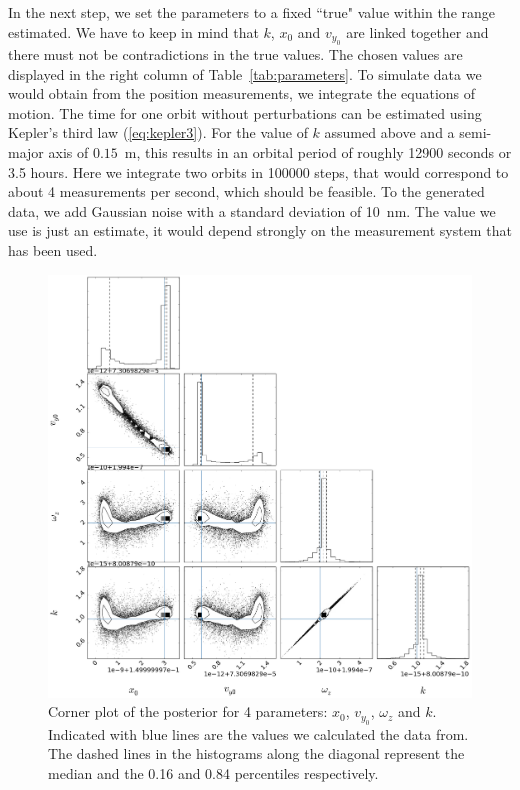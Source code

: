 \documentclass[prb,preprint]{revtex4-1}
\begin{document}
In the next step, we set the parameters to a fixed ``true" value
within the range estimated. We have to keep in mind that $k$, $x_0$
and $v_{y_0}$ are linked together and there must not be contradictions
in the true values. The chosen values are displayed in the right
column of Table~\ref{tab:parameters}.  To simulate data we would
obtain from the position measurements, we integrate the equations of
motion. The time for one orbit without perturbations can be estimated
using Kepler's third law (\ref{eq:kepler3}). For the value of $k$
assumed above and a semi-major axis of $0.15$~m, this
results in an orbital period of roughly 12900 seconds or
3.5 hours. Here we integrate two orbits in 100000
steps, that would correspond to about 4 measurements per second,
which should be feasible. To the generated data, we add Gaussian noise
with a standard deviation of 10~nm. The value we use is just an estimate,
it would depend strongly on the measurement system that has been used.

\begin{figure}[h]
	\centering
	\includegraphics[width=1.0\textwidth]{img/4cornerfit.png}
	\caption{Corner plot of the posterior for 4 parameters: $x_0$, $v_{y_0}$, $\omega_z$ and $k$. Indicated with blue lines are the values we calculated the data from. The dashed lines in the histograms along the diagonal represent the median and the 0.16 and 0.84 percentiles respectively.}
	\label{fig:plotCorner4}
\end{figure}
\end{document}
